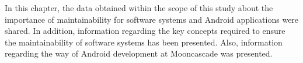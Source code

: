 In this chapter, the data obtained within the scope of this study about the importance of maintainability for software systems and Android applications were shared. In addition, information regarding the key concepts required to ensure the maintainability of software systems has been presented. Also, information regarding the way of Android development at Mooncascade was presented.